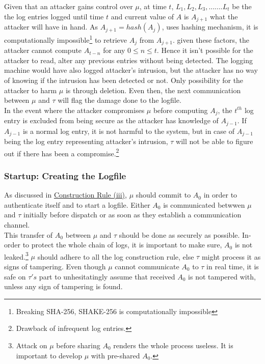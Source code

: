 \documentclass[12pt, letter]{article}
\begin{document}
Given that an attacker gains control over $\mu$, at time $t$, $L_1, L_2, L_3, ....... L_t$ be the the log entries logged until time $t$ and current value of $A$ is $A_{j+1}$ what the attacker will have in hand. As $A_{j+1} = hash(A_j)$, uses hashing mechanism, it is computationally impossible\footnote{Breaking SHA-256, SHAKE-256 is computationally impossible} to retrieve $A_j$ from $A_{j+1}$. given these factors, the attacker cannot compute $A_{t-n}$ for any $0 \leq n \leq t$. Hence it isn't possible for the attacker to read, alter any previous entries without being detected. The logging machine would have also logged attacker's intrusion, but the attacker has no way of knowing if the intrusion has been detected or not. Only possibility for the attacker to harm $\mu$ is through deletion. Even then, the next communication between $\mu$ and $\tau$ will flag the damage done to the logfile.\\


In the event where the attacker compromises $\mu$ before computing $A_j$, the $t^{th}$ log entry is excluded from being secure as the attacker has knowledge of $A_{j-1}$. If $A_{j-1}$ is a normal log entry, it is not harmful to the system, but in case of $A_{j-1}$ being the log entry representing attacker's intrusion, $\tau$ will not be able to figure out if there has been a compromise.\footnote{Drawback of infrequent log entries.}


\subsubsection{Startup: Creating the Logfile}

As discussed in \hyperref[sec:rules]{Construction Rule (iii)}, $\mu$ should commit to $A_0$ in order to authenticate itself and to start a logfile. Either $A_0$ is communicated betwwen $\mu$ and $\tau$ initially before dispatch or as soon as they establish a communication channel.\\


This transfer of $A_0$ between $\mu$ and $\tau$ should be done as securely as possible. In-order to protect the whole chain of logs, it is important to make sure, $A_0$ is not leaked.\footnote{Attack on $\mu$ before sharing $A_0$ renders the whole process useless. It is important to develop $\mu$ with pre-shared $A_0$.} $\mu$ should adhere to all the log construction rule, else $\tau$ might process it as signs of tampering. Even though $\mu$ cannot communicate $A_0$ to $\tau$ in real time, it is safe on $\tau's$ part to unhesitatingly assume that received $A_0$ is not tampered with, unless any sign of tampering is found.\\
\end{document}
